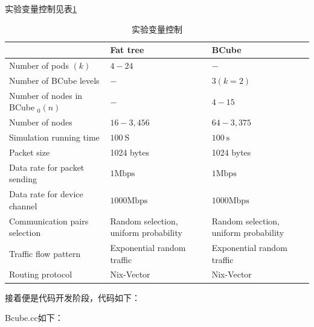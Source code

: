 \documentclass[lang=cn,11pt,a4paper,cite=authoryear]{elegantpaper}
\begin{document}
实验变量控制见表\ref{table:bianliang}

\begin{table}[htbp]
	\centering
	\begin{tabular}{|l|l|l|}
		\hline & Fat tree & BCube \\
		\hline Number of pods $(k)$ & $4-24$ & $-$ \\
		\hline Number of BCube levels & $-$ & $3(k=2)$ \\
		\hline Number of nodes in BCube $_{0}(n)$ & $-$ & $4-15$ \\
		\hline Number of nodes & $16-3,456$ & $64-3,375$ \\
		\hline Simulation running time & $100 \mathrm{~S}$ & $100 \mathrm{~s}$ \\
		\hline Packet size & 1024 bytes & 1024 bytes \\
		\hline Data rate for packet sending & $1 \mathrm{Mbps}$ & $1 \mathrm{Mbps}$ \\
		\hline Data rate for device channel & $1000 \mathrm{Mbps}$ & $1000 \mathrm{Mbps}$ \\
		\hline Communication pairs selection & Random selection, uniform probability & Random selection, uniform probability \\
		\hline Traffic flow pattern & Exponential random traffic & Exponential random traffic \\
		\hline Routing protocol & Nix-Vector & Nix-Vector \\
		\hline
	\end{tabular}
	\caption{实验变量控制}
	\label{table:bianliang}
\end{table}


接着便是代码开发阶段，代码如下：

Bcube.cc如下：
\end{document}
